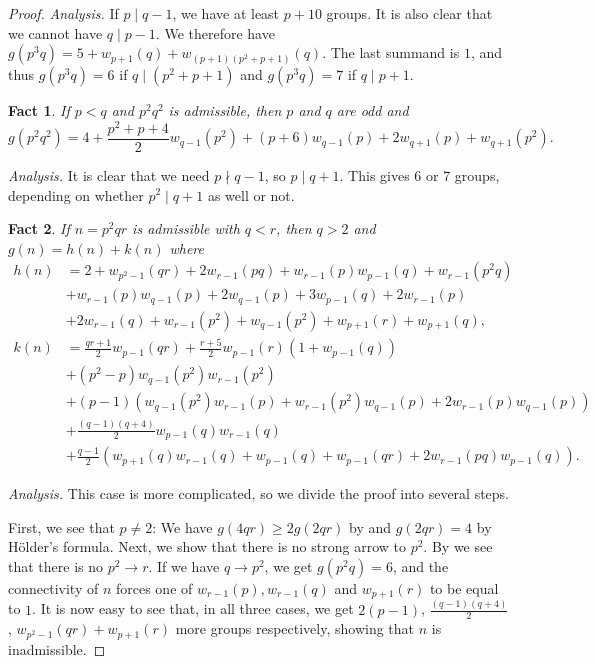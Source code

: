 \documentclass[a4paper, 12pt]{article}
\newcommand{\hthref}[1]{\hyperref[#1]{\thref{#1}}}
\theoremstyle{plain}
\newtheorem{eufact}{Fact}[section]
\theoremstyle{definition}
\begin{document}
\begin{proof}
\textit{Analysis.} If $p \mid q - 1$, we have at least $p + 10$ groups. It is also clear that we cannot have $q \mid p - 1$. We therefore have $g(p^3 q) = 5 + w_{p + 1}(q) + w_{(p + 1)(p^2 + p + 1)}(q)$. The last summand is $1$, and thus $g(p^3 q) = 6$ if $q \mid (p^2 + p + 1)$ and $g(p^3 q) = 7$ if $q \mid p + 1$.

\begin{eufact}
	If $p < q$ and $p^2 q^2$ is admissible, then $p$ and $q$ are odd and
	\[g(p^2 q^2) = 4 + \frac{p^2 + p + 4}{2} w_{q - 1}(p^2) + (p + 6)w_{q - 1}(p) + 2w_{q + 1}(p) + w_{q + 1}(p^2).\]
\end{eufact}

\textit{Analysis.} It is clear that we need $p \nmid q - 1$, so $p \mid q + 1$. This gives 6 or 7 groups, depending on whether $p^2 \mid q + 1$ as well or not.

\begin{eufact} 
	If $n = p^2 q r$ is admissible with $q < r$, then $q > 2$ and $g(n) = h(n) + k(n)$ where$$\begin{aligned}
		h(n) &= 2 + w_{p^2 - 1}(qr) + 2w_{r - 1}(pq) + w_{r - 1}(p)w_{p - 1}(q) + w_{r - 1}(p^2 q) \\ 
		&+ w_{r - 1}(p)w_{q - 1}(p) + 2w_{q - 1}(p) + 3w_{p - 1}(q) + 2w_{r - 1}(p) \\ 
		&+ 2w_{r - 1}(q) + w_{r - 1}(p^2) + w_{q - 1}(p^2) + w_{p + 1}(r) + w_{p + 1}(q), \\
		k(n) &= \frac{qr + 1}{2} w_{p - 1}(qr) + \frac{r + 5}{2} w_{p - 1}(r)(1 + w_{p - 1}(q))\\
		&+ (p^2 - p)w_{q - 1}(p^2)w_{r - 1}(p^2) \\
		&+ (p - 1)(w_{q - 1}(p^2)w_{r - 1}(p) + w_{r - 1}(p^2)w_{q - 1}(p) + 2w_{r - 1}(p)w_{q - 1}(p)) \\
		&+ \frac{(q - 1)(q + 4)}{2} w_{p - 1}(q)w_{r - 1}(q) \\
		&+ \frac{q - 1}{2} (w_{p + 1}(q)w_{r - 1}(q) + w_{p - 1}(q) + w_{p - 1}(qr) + 2w_{r - 1}(pq)w_{p - 1}(q)).
	\end{aligned}$$
\end{eufact}

\textit{Analysis.} This case is more complicated, so we divide the proof into several steps.

First, we see that $p \neq 2$: We have $g(4 q r) \ge 2g(2qr)$ by \hthref{eubold} and $g(2qr) = 4$ by Hölder's formula. Next, we show that there is no strong arrow to $p^2$. By \hthref{euppq} we see that there is no $p^2 \rightarrow r$. If we have $q \rightarrow p^2$, we get $g(p^2 q) = 6$, and the connectivity of $n$ forces one of $w_{r - 1}(p), w_{r - 1}(q)$ and $w_{p + 1}(r)$ to be equal to $1$. It is now easy to see that, in all three cases, we get
$2(p - 1)$, $\frac{(q - 1)(q + 4)}{2}$,  $w_{p^2 - 1}(qr) + w_{p + 1}(r)$ more groups
respectively, showing that $n$ is inadmissible. 


\end{proof}
\end{document}
